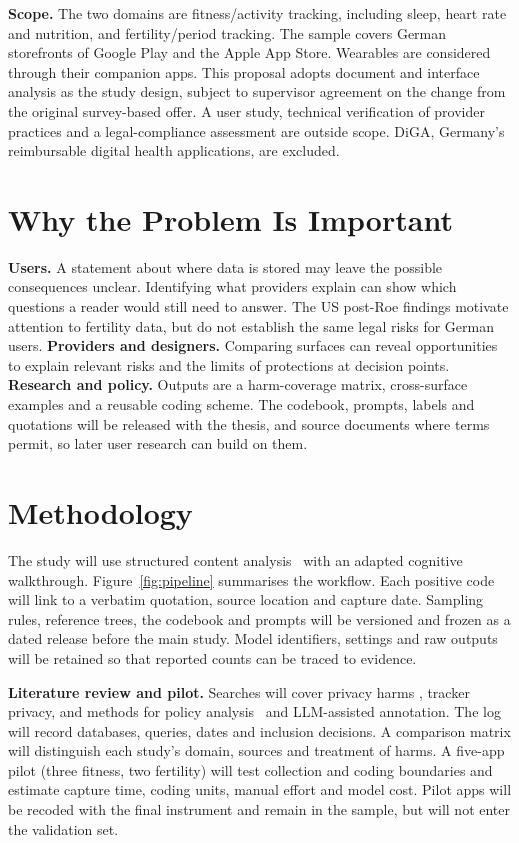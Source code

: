 \documentclass[sigconf,nonacm,natbib=false]{acmart}
\begin{document}
\noindent\textbf{Scope.} The two domains are fitness/activity tracking,
including sleep, heart rate and nutrition, and fertility/period tracking.
The sample covers German storefronts of Google Play and the Apple App Store.
Wearables are considered through their companion apps. This proposal adopts
document and interface analysis as the study design, subject to supervisor
agreement on the change from the original survey-based offer. A user study,
technical verification of provider practices and a legal-compliance assessment
are outside scope. DiGA, Germany's reimbursable digital health applications,
are excluded.

\section{Why the Problem Is Important}

\textbf{Users.} A statement about where data is stored may leave the possible
consequences unclear. Identifying what providers explain can show which
questions a reader would still need to answer. The US
post-Roe findings motivate attention to fertility data, but do not establish
the same legal risks for German users.
\textbf{Providers and designers.} Comparing surfaces can reveal opportunities
to explain relevant risks and the limits of protections at decision points.
\textbf{Research and policy.} Outputs are a harm-coverage matrix,
cross-surface examples and a reusable coding scheme. The codebook, prompts,
labels and quotations will be released with the thesis, and source documents
where terms permit, so later user research can build on them.

\section{Methodology}

The study will use structured content analysis~\parencite{krippendorff2019content}
with an adapted cognitive walkthrough. Figure~\ref{fig:pipeline} summarises
the workflow. Each positive code will link to a verbatim quotation, source
location and capture date. Sampling rules, reference trees, the codebook and
prompts will be versioned and frozen as a dated release before the main study.
Model identifiers, settings and raw outputs will be retained so that reported
counts can be traced to evidence.

\textbf{Literature review and pilot.} Searches will cover privacy harms
\parencite{solove2006taxonomy,calo2011boundaries}, tracker privacy, and
methods for policy analysis~\parencite{wilson2016creation,zimmeck2019maps}
and LLM-assisted annotation. The log will record databases, queries, dates and
inclusion decisions. A comparison matrix will distinguish each study's domain,
sources and treatment of harms. A five-app pilot (three fitness, two
fertility) will test collection and coding boundaries and estimate capture
time, coding units, manual effort and model cost. Pilot apps will be recoded
with the final instrument and remain in the sample, but will not enter the
validation set.
\end{document}
